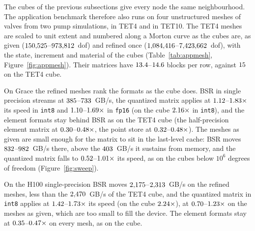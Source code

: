 \documentclass[sigconf,balance=false]{acmart}
\begin{document}
The cubes of the previous subsections give every node the same neighbourhood.  The application
benchmark therefore also runs on four unstructured meshes of valves from two pump simulations, in TET4
and in TET10.  The TET4 meshes are
scaled to unit extent and numbered along a Morton curve as the cubes are, as given
($150{,}525$--$973{,}812$~dof) and refined once
($1{,}084{,}416$--$7{,}423{,}662$~dof), with the state, increment and material of the
cubes (Table~\ref{tab:appmesh}, Figure~\ref{fig:appmesh}).  Their matrices have
$13.4$--$14.6$ blocks per row, against
$15$ on the TET4 cube.

On Grace the refined meshes rank the formats as the cube does.  BSR in single precision streams
at $385$--$733$~GB/s, the quantized
matrix applies at $1.12$--$1.83\times$ its speed in
\texttt{int8} and $1.10$--$1.69\times$ in \texttt{fp16}
(on the cube $2.16\times$ in \texttt{int8}), and the element formats stay
behind BSR as on the TET4 cube (the half-precision element matrix at
$0.30$--$0.48\times$, the point store at
$0.32$--$0.48\times$).  The meshes as given are small enough
for the matrix to sit in the last-level cache: BSR moves
$832$--$982$~GB/s there, above the
$403$~GB/s it sustains from memory, and the quantized matrix falls to
$0.52$--$1.01\times$ its speed, as on the cubes below
$10^6$ degrees of freedom (Figure~\ref{fig:sweep}).

On the H100 single-precision BSR moves $2{,}175$--$2{,}313$~GB/s
on the refined meshes, less than the $2{,}470$~GB/s of the TET4 cube, and the
quantized matrix in \texttt{int8} applies at $1.42$--$1.73\times$
its speed (on the cube $2.24\times$), at
$0.70$--$1.23\times$ on the meshes as given, which are too
small to fill the device.  The element formats stay at
$0.35$--$0.47\times$ on every mesh, as on the cube.
\end{document}
